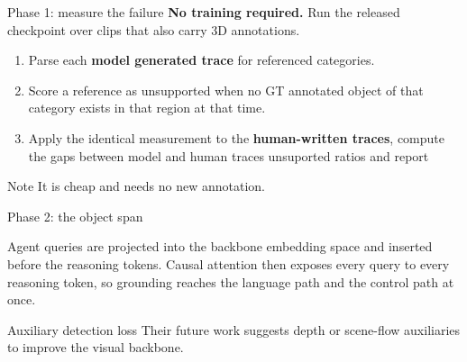 \documentclass[aspectratio=169,11pt,t]{beamer}
\newcommand{\refcite}[1]{\textcolor{tuered}{\scriptsize\cite{#1}}}
\begin{document}
\begin{frame}{Phase 1: measure the failure}
  \textbf{No training required.} Run the released checkpoint over clips that
  also carry 3D annotations.

  \vspace{0.4em}
  \begin{enumerate}
    \item Parse each \textbf{model generated trace} for referenced categories.
    \item Score a reference as \alert{unsupported} when no GT annotated object of that category exists in that region at that time.
    \item Apply the identical measurement to the \textbf{human-written traces}, compute the gaps between model and human traces \alert{unsuported ratios} and report
  \end{enumerate}


  \vspace{0.5em}
  \begin{block}{Note}
    It is cheap and needs no new annotation.
  \end{block}
\end{frame}

\begin{frame}{Phase 2: the object span}
  \vspace{-0.4em}
  \begin{center}
  \end{center}

  Agent queries are projected into the backbone embedding space and inserted
  \alert{before} the reasoning tokens. \alert{Causal attention then exposes every
  query} to every reasoning token, so grounding reaches the language path and
  the control path at once.

  \vspace{0.3em}
  \begin{block}{Auxiliary detection loss}
    Their future work\refcite{NVIDIA2025AlpamayoR1} suggests
    depth or scene-flow auxiliaries to improve the
    visual backbone. 
  \end{block}
\end{frame}
\end{document}
